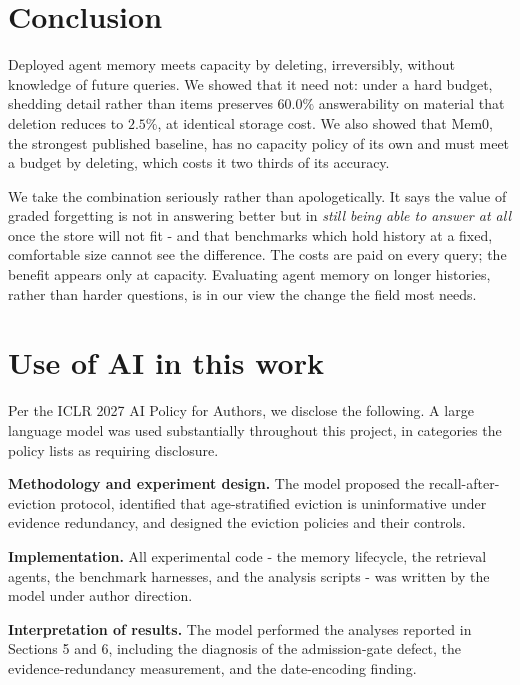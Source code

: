 \documentclass{article}
\theoremstyle{definition}\newtheorem{remark}{Remark}
\theoremstyle{plain}\newtheorem{proposition}{Proposition}
\begin{document}
\section{Conclusion}

Deployed agent memory meets capacity by deleting, irreversibly, without
knowledge of future queries. We showed that it need not: under a hard budget,
shedding detail rather than items preserves $60.0\%$ answerability on material
that deletion reduces to $2.5\%$, at identical storage cost. We also showed that Mem0, the strongest
published baseline, has no capacity policy of its own and must meet a budget
by deleting, which costs it two thirds of its accuracy.

We take the combination seriously rather than apologetically. It says the value
of graded forgetting is not in answering better but in \emph{still being able to
answer at all} once the store will not fit - and that benchmarks which hold
history at a fixed, comfortable size cannot see the difference. The costs are
paid on every query; the benefit appears only at capacity. Evaluating agent
memory on longer histories, rather than harder questions, is in our view the
change the field most needs.

\section*{Use of AI in this work}

Per the ICLR 2027 AI Policy for Authors, we disclose the following. A large
language model was used substantially throughout this project, in categories
the policy lists as requiring disclosure.

\textbf{Methodology and experiment design.} The model proposed the
recall-after-eviction protocol, identified that age-stratified eviction is
uninformative under evidence redundancy, and designed the eviction policies and
their controls.

\textbf{Implementation.} All experimental code - the memory lifecycle, the
retrieval agents, the benchmark harnesses, and the analysis scripts - was
written by the model under author direction.

\textbf{Interpretation of results.} The model performed the analyses reported
in Sections 5 and 6, including the diagnosis of the admission-gate defect, the
evidence-redundancy measurement, and the date-encoding finding.
\end{document}
